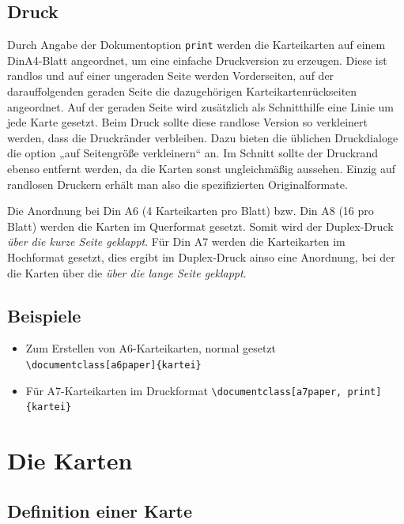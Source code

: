 \documentclass[a4paper]{article}
\begin{document}
\subsection{Druck}
Durch Angabe der Dokumentoption \lstinline!print! werden die Karteikarten auf einem DinA4-Blatt angeordnet, um eine einfache Druckversion zu erzeugen. Diese ist randlos und auf einer ungeraden Seite werden Vorderseiten, auf der darauffolgenden geraden Seite die dazugehörigen Karteikartenrückseiten angeordnet. Auf der geraden Seite wird zusätzlich als Schnitthilfe eine Linie um jede Karte gesetzt.
Beim Druck sollte diese randlose Version so verkleinert werden, dass die Druckränder verbleiben. Dazu bieten die üblichen Druckdialoge die option „auf Seitengröße verkleinern“ an. Im Schnitt sollte der Druckrand ebenso entfernt werden, da die Karten sonst ungleichmäßig aussehen. Einzig auf randlosen Druckern erhält man also die spezifizierten Originalformate.

Die Anordnung bei Din A6 (4 Karteikarten pro Blatt) bzw. Din A8 (16 pro Blatt) werden die Karten im Querformat gesetzt. Somit wird der Duplex-Druck  \emph{über die kurze Seite geklappt}. Für Din A7 werden die Karteikarten im Hochformat gesetzt, dies ergibt im Duplex-Druck ainso eine Anordnung, bei der die Karten über die \emph{über die lange Seite geklappt}.

\subsection{Beispiele}
\begin{itemize}
	\item Zum Erstellen von A6-Karteikarten, normal gesetzt \lstinline!\documentclass[a6paper]{kartei}!
	\item Für A7-Karteikarten im Druckformat \lstinline!\documentclass[a7paper, print]{kartei}!
\end{itemize}
%
%
%
\section{Die Karten}

\subsection{Definition einer Karte}
\end{document}
